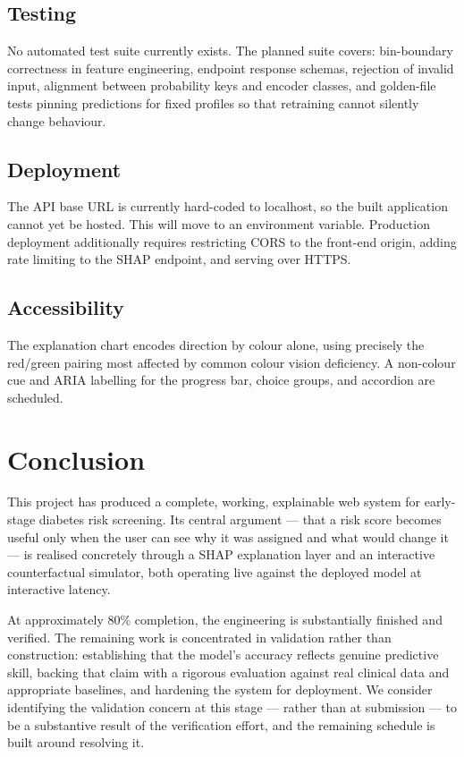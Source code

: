 \documentclass[11pt,a4paper]{article}
\begin{document}
\subsection{Testing}
No automated test suite currently exists. The planned suite covers: bin-boundary
correctness in feature engineering, endpoint response schemas, rejection of
invalid input, alignment between probability keys and encoder classes, and
golden-file tests pinning predictions for fixed profiles so that retraining
cannot silently change behaviour.

\subsection{Deployment}
The API base URL is currently hard-coded to localhost, so the built application
cannot yet be hosted. This will move to an environment variable. Production
deployment additionally requires restricting CORS to the front-end origin,
adding rate limiting to the SHAP endpoint, and serving over HTTPS.

\subsection{Accessibility}
The explanation chart encodes direction by colour alone, using precisely the
red/green pairing most affected by common colour vision deficiency. A
non-colour cue and ARIA labelling for the progress bar, choice groups, and
accordion are scheduled.

\section{Conclusion}

This project has produced a complete, working, explainable web system for
early-stage diabetes risk screening. Its central argument --- that a risk score
becomes useful only when the user can see why it was assigned and what would
change it --- is realised concretely through a SHAP explanation layer and an
interactive counterfactual simulator, both operating live against the deployed
model at interactive latency.

At approximately 80\% completion, the engineering is substantially finished and
verified. The remaining work is concentrated in validation rather than
construction: establishing that the model's accuracy reflects genuine predictive
skill, backing that claim with a rigorous evaluation against real clinical data
and appropriate baselines, and hardening the system for deployment. We consider
identifying the validation concern at this stage --- rather than at submission
--- to be a substantive result of the verification effort, and the remaining
schedule is built around resolving it.
\end{document}
